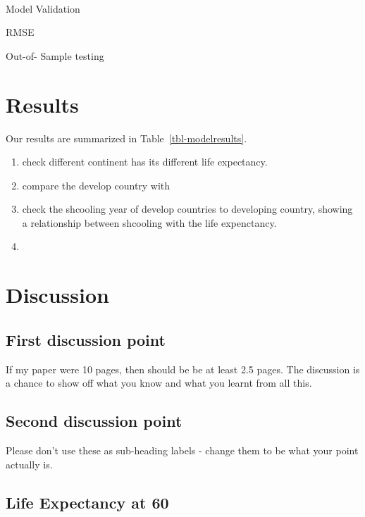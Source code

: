 \documentclass[
  letterpaper,
  DIV=11,
  numbers=noendperiod]{scrartcl}
\makeatletter
\let\oldparagraph\paragraph
\renewcommand{\paragraph}{
    \@ifstar
      \xxxParagraphStar
      \xxxParagraphNoStar
  }
\newcommand{\xxxParagraphStar}[1]{\oldparagraph*{#1}\mbox{}}
\newcommand{\xxxParagraphNoStar}[1]{\oldparagraph{#1}\mbox{}}
\providecommand{\tightlist}{%
  \setlength{\itemsep}{0pt}\setlength{\parskip}{0pt}}\usepackage{longtable,booktabs,array}
\makeatother
\begin{document}
\paragraph{Model Validation}\label{model-validation}

RMSE

Out-of- Sample testing

\section{Results}\label{results}

Our results are summarized in Table~\ref{tbl-modelresults}.

\begin{enumerate}
\def\labelenumi{\arabic{enumi}.}
\tightlist
\item
  check different continent has its different life expectancy.
\item
  compare the develop country with
\item
  check the shcooling year of develop countries to developing country,
  showing a relationship between shcooling with the life expenctancy.
\item
\end{enumerate}

\section{Discussion}\label{discussion}

\subsection{First discussion point}\label{sec-first-point}

If my paper were 10 pages, then should be be at least 2.5 pages. The
discussion is a chance to show off what you know and what you learnt
from all this.

\subsection{Second discussion point}\label{second-discussion-point}

Please don't use these as sub-heading labels - change them to be what
your point actually is.

\subsection{Life Expectancy at 60}\label{life-expectancy-at-60}
\end{document}
